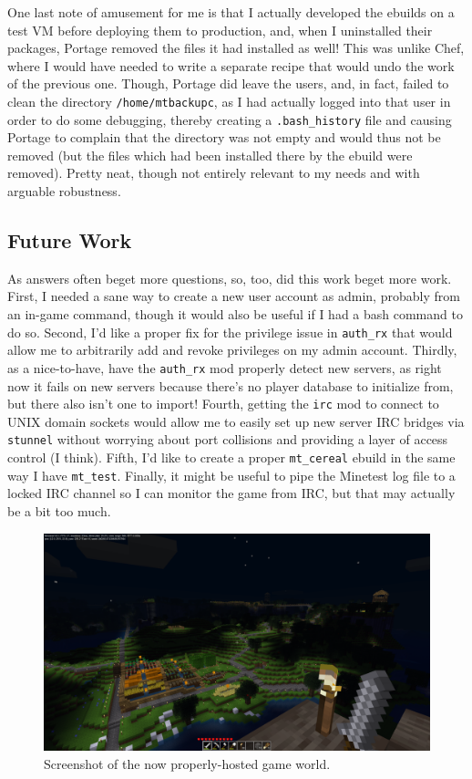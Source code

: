 \documentclass{article}
\begin{document}
One last note of amusement for me is that I actually developed the ebuilds on a test VM before deploying them to production, and, when I uninstalled their packages, Portage removed the files it had installed as well!  This was unlike Chef, where I would have needed to write a separate recipe that would undo the work of the previous one.  Though, Portage did leave the users, and, in fact, failed to clean the directory \texttt{/home/mtbackupc}, as I had actually logged into that user in order to do some debugging, thereby creating a \texttt{.bash_history} file and causing Portage to complain that the directory was not empty and would thus not be removed (but the files which had been installed there by the ebuild were removed).  Pretty neat, though not entirely relevant to my needs and with arguable robustness.

\subsection{Future Work}
As answers often beget more questions, so, too, did this work beget more work.  First, I needed a sane way to create a new user account as admin, probably from an in-game command, though it would also be useful if I had a bash command to do so.  Second, I'd like a proper fix for the privilege issue in \texttt{auth_rx} that would allow me to arbitrarily add and revoke privileges on my admin account.  Thirdly, as a nice-to-have, have the \texttt{auth_rx} mod properly detect new servers, as right now it fails on new servers because there's no player database to initialize from, but there also isn't one to import!  Fourth, getting the \texttt{irc} mod to connect to UNIX domain sockets would allow me to easily set up new server IRC bridges via \texttt{stunnel} without worrying about port collisions and providing a layer of access control (I think).  Fifth, I'd like to create a proper \texttt{mt_cereal} ebuild in the same way I have \texttt{mt_test}.  Finally, it might be useful to pipe the Minetest log file to a locked IRC channel so I can monitor the game from IRC, but that may actually be a bit too much.

\begin{figure}
\begin{center}
\includegraphics[scale=0.25]{files/blog/2019_07_20_minetest_5_0_1_upgrade_and_server_hosting/2019_07_20_hosted.png}
\caption{Screenshot of the now properly-hosted game world.}
\end{center}
\end{figure}
\end{document}
